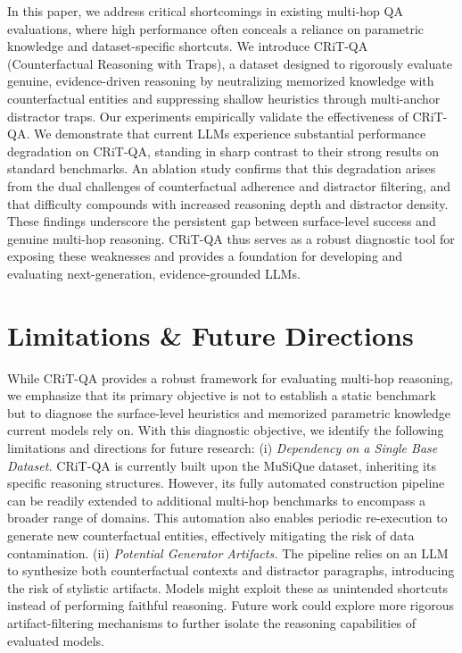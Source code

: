 \documentclass[10pt, a4paper]{article}
\begin{document}
In this paper, we address critical shortcomings in existing multi-hop QA evaluations, where high performance often conceals a reliance on parametric knowledge and dataset-specific shortcuts. We introduce CRiT-QA (Counterfactual Reasoning with Traps), a dataset designed to rigorously evaluate genuine, evidence-driven reasoning by neutralizing memorized knowledge with counterfactual entities and suppressing shallow heuristics through multi-anchor distractor traps. Our experiments empirically validate the effectiveness of CRiT-QA. We demonstrate that current LLMs experience substantial performance degradation on CRiT-QA, standing in sharp contrast to their strong results on standard benchmarks. An ablation study confirms that this degradation arises from the dual challenges of counterfactual adherence and distractor filtering, and that difficulty compounds with increased reasoning depth and distractor density. These findings underscore the persistent gap between surface-level success and genuine multi-hop reasoning. CRiT-QA thus serves as a robust diagnostic tool for exposing these weaknesses and provides a foundation for developing and evaluating next-generation, evidence-grounded LLMs.

\section{Limitations \& Future Directions}
While CRiT-QA provides a robust framework for evaluating multi-hop reasoning, we emphasize that its primary objective is not to establish a static benchmark but to diagnose the surface-level heuristics and memorized parametric knowledge current models rely on. With this diagnostic objective, we identify the following limitations and directions for future research: (i) \textit{Dependency on a Single Base Dataset.} CRiT-QA is currently built upon the MuSiQue dataset, inheriting its specific reasoning structures. However, its fully automated construction pipeline can be readily extended to additional multi-hop benchmarks to encompass a broader range of domains. This automation also enables periodic re-execution to generate new counterfactual entities, effectively mitigating the risk of data contamination. (ii) \textit{Potential Generator Artifacts.} The pipeline relies on an LLM to synthesize both counterfactual contexts and distractor paragraphs, introducing the risk of stylistic artifacts. Models might exploit these as unintended shortcuts instead of performing faithful reasoning. Future work could explore more rigorous artifact-filtering mechanisms to further isolate the reasoning capabilities of evaluated models.
\end{document}
